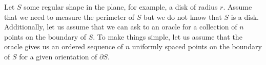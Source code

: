 Let $S$ some regular shape in the plane, for example, a disk of radius $r$. Assume that we need to measure the perimeter of $S$ but we do not know that $S$ is a disk. Additionally, let us assume that we can ask to an oracle for a collection of $n$ points on the boundary of $S$. To make things simple, let us assume that the oracle gives us an ordered sequence of $n$ uniformly spaced points on the boundary of $S$ for a given orientation of $\partial S$. 

\begin{figure}
\center
{}
\end{figure}
